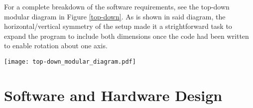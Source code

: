 \documentclass[journal]{Imperial_lab_report}
\begin{document}
For a complete breakdown of the software requirements, see the top-down modular diagram in Figure \ref{top-down}. As is shown in said diagram, the horizontal/vertical symmetry of the setup made it a strightforward task to expand the program to include both dimensions once the code had been written to enable rotation about one axis. 

\begin{figure*}[!t]
	\centering
	\texttt{[image: top-down\_modular\_diagram.pdf]}
	\caption{Top-down modular diagram explaining the high level requirements of the program written to allow the solar panel to trace the direction of the incident light. In the diagram it becomes clear that the horizontal/vertical symmetry of the problem will allow for a large portion of the code to be reused. }
	\label{top-down}
\end{figure*}

\section{Software and Hardware Design}
\end{document}
